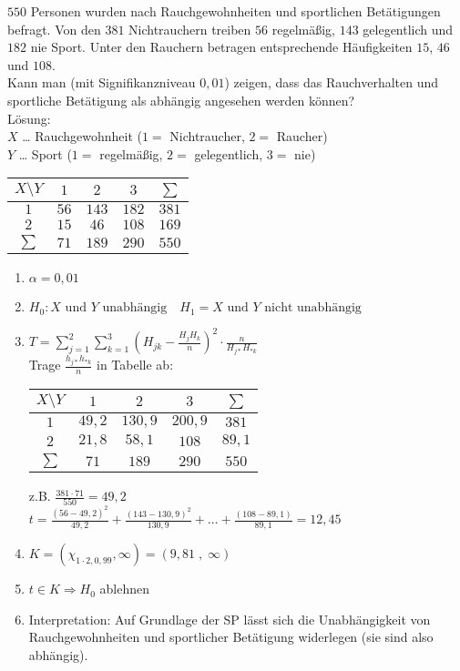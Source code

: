 \documentclass{scrreprt}
\begin{document}
 $550$ Personen wurden nach Rauchgewohnheiten und sportlichen Betätigungen befragt. Von den $381$ Nichtrauchern treiben $56$ regelmäßig, $143$ gelegentlich und $182$ nie Sport. Unter den Rauchern betragen entsprechende Häufigkeiten $15$, $46$ und $108$.\\
Kann man (mit Signifikanzniveau $0,01$) zeigen, dass das Rauchverhalten und sportliche Betätigung als abhängig angesehen werden können?\\
Lösung:\\
$X$ … Rauchgewohnheit ($1=$ Nichtraucher, $2=$ Raucher)\\
$Y$ … Sport ($1=$ regelmäßig, $2=$ gelegentlich, $3=$ nie)\\
\begin{tabular}{c | c c c | c}
$X\setminus Y$ & $1$ & $2$ & $3$ & $\sum$\\\hline
$1$ & $56$ & $143$ & $182$ & $381$\\
$2$ & $15$ & $46$ & $108$ & $169$\\\hline
$\sum$& $71$ & $189$ & $290$ & $550$
\end{tabular}
\begin{enumerate}
\item $\alpha = 0,01$
\item $H_0: X\text{ und }Y\text{ unabhängig} \quad H_1=X \text{ und }Y \text{ nicht unabhängig}$
\item $T=\sum_{j=1}^2 \sum_{k=1}^3 \left(H_{jk}-\frac{H_j H_k}{n}\right)^2 \cdot \frac{n}{H_{j*}H_{*k}}$\\
Trage $\frac{h_{j*}h_{*k}}{n}$ in Tabelle ab:\\
\begin{tabular}{c | c c c | c}
$X\setminus Y$ & $1$ & $2$ & $3$ & $\sum$\\\hline
$1$ & $49,2$ & $130,9$ & $200,9$ & $381$\\
$2$ & $21,8$ & $58,1$ & $108$ & $89,1$\\\hline
$\sum$& $71$ & $189$ & $290$ & $550$
\end{tabular} z.B. $\frac{381\cdot 71}{550}=49,2$\\
$t=\frac{(56-49,2)^2}{49,2}+\frac{(143-130,9)^2}{130,9}+\ldots + \frac{(108-89,1)}{89,1}=12,45$
\item $K=(\chi_{1\cdot 2, 0,99},\infty) = (9,81\;,\; \infty)$
\item $t\in K \Rightarrow H_0 $ ablehnen
\item Interpretation: Auf Grundlage der SP lässt sich die Unabhängigkeit von Rauchgewohnheiten und sportlicher Betätigung widerlegen (sie sind also abhängig).
\end{enumerate}


\end{document}
